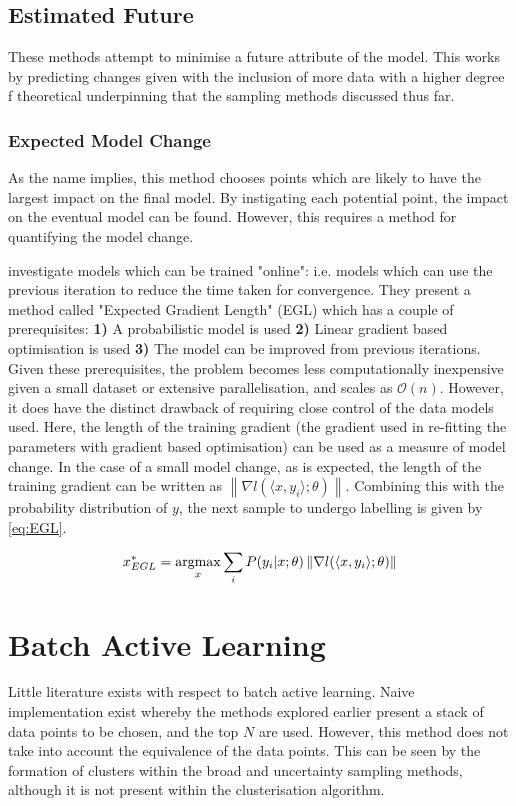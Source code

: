 \subsection{Estimated Future}
These methods attempt to minimise a future attribute of the model. This works by predicting changes given with the inclusion of more data with a higher degree f theoretical underpinning that the sampling methods discussed thus far.

\subsubsection{Expected Model Change}
As the name implies, this method chooses points which are likely to have the largest impact on the final model. By instigating each potential point, the impact on the eventual model can be found. However, this requires a method for quantifying the model change.

\textcite{Set08,Set09} investigate models which can be trained "online": i.e. models which can use the previous iteration to reduce the time taken for convergence. They present a method called "Expected Gradient Length" (EGL) which has a couple of prerequisites: \textbf{1)} A probabilistic model is used \textbf{2)} Linear gradient based optimisation is used \textbf{3)} The model can be improved from previous iterations. Given these prerequisites, the problem becomes less computationally inexpensive given a small dataset or extensive parallelisation, and scales as $\mathcal{O}(n)$. However, it does have the distinct drawback of requiring close control of the data models used. Here, the length of the training gradient (the gradient used in re-fitting the parameters with gradient based optimisation) can be used as a measure of model change. In the case of a small model change, as is expected, the length of the training gradient can be written as ${\left\|\nabla{}l(\langle{}x, y_i\rangle{};\theta{})\right\|}$. Combining this with the probability distribution of $y$, the next sample to undergo labelling is given by \ref{eq:EGL}.

\begin{equation}
  \label{eq:EGL}
  x_{EGL}^*=\operatorname*{argmax}_x{\sum_i{P(y_i|x;\theta{})\left\|\nabla{}l(\langle{}x, y_i\rangle{};\theta{})\right\|}}
\end{equation}


\section{Batch Active Learning}
Little literature exists with respect to batch active learning. Naive implementation exist whereby the methods explored earlier present a stack of data points to be chosen, and the top $N$ are used. However, this method does not take into account the equivalence of the data points. This can be seen by the formation of clusters within the broad and uncertainty sampling methods, although it is not present within the clusterisation algorithm.

